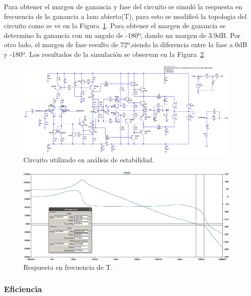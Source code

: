 Para obtener el margen de ganancia y fase del circuito se simuló la respuesta en frecuencia de la ganancia a lazo abierto(T), para esto se modificó la topologia del circuito como se ve en la Figura~\ref{cir_simul_estab}. Para obtener el margen de ganancia se determino la ganancia con un angulo de -180º, dando un margen de 3.9dB. Por otro lado, el margen de fase resulto de 72º,siendo la diferencia entre la fase a 0dB y -180º.
Los resultados de la simulación se observan en la Figura~\ref{simul_estab}.

\begin{figure}[H]
\centering
\includegraphics[width=1\textwidth]{img/margen_fase_ganancia_cir.png}
\caption{Circuito utilizado en análisis de estabilidad.}
\label{cir_simul_estab}
\end{figure}


\begin{figure}[H]
\centering
\includegraphics[width=1\textwidth]{img/margen_fase_ganancia.png}
\caption{Respuesta en frecuencia de T.}
\label{simul_estab}
\end{figure}

\medskip
\subsubsection{Eficiencia}

